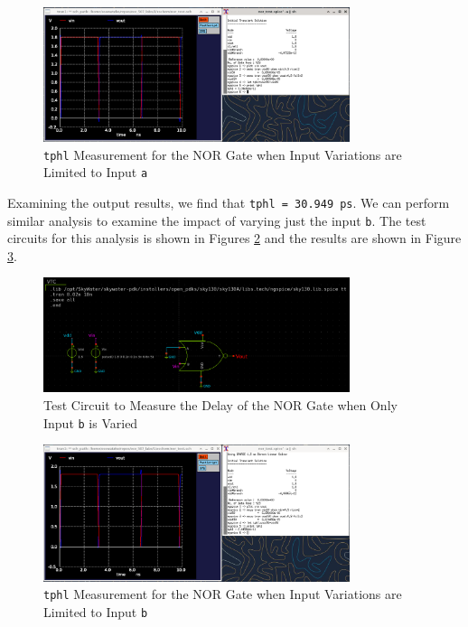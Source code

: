 \documentclass[fleqn]{article}
\begin{document}
	\begin{figure}[H]
		\centerline{\includegraphics[width=0.8\textwidth]{nor_delay_sweep_va.png}}
		\caption{\texttt{tphl} Measurement for the NOR Gate when Input Variations are Limited to Input \texttt{a}}
		\label{fig::nor_delay_sweep_va}
	\end{figure}
	
	Examining the output results, we find that \texttt{tphl = 30.949 ps}. We can perform similar analysis to examine the impact of varying just the input \texttt{b}. The test circuits for this analysis is shown in Figures \ref{fig::nor_delay_test_sweep_vb} and the results are shown in Figure \ref{fig::nor_delay_sweep_vb}.
	
	\begin{figure}[H]
		\centerline{\includegraphics[width=0.8\textwidth]{nor_delay_test_sweep_vb.png}}
		\caption{Test Circuit to Measure the Delay of the NOR Gate when Only Input \texttt{b} is Varied}
		\label{fig::nor_delay_test_sweep_vb}
	\end{figure}
	
	\begin{figure}[H]
		\centerline{\includegraphics[width=0.8\textwidth]{nor_delay_sweep_vb.png}}
		\caption{\texttt{tphl} Measurement for the NOR Gate when Input Variations are Limited to Input \texttt{b}}
		\label{fig::nor_delay_sweep_vb}
	\end{figure}
	
\end{document}
